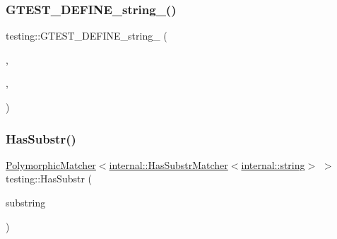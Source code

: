 \mbox{\label{namespacetesting_a145c2b7b4242b148b8d167f737b0d7c6}} 
\subsubsection{\texorpdfstring{G\+T\+E\+S\+T\+\_\+\+D\+E\+F\+I\+N\+E\+\_\+string\+\_\+()}{GTEST\_DEFINE\_string\_()}\hspace{0.1cm}{\footnotesize\ttfamily [5/5]}}
{\footnotesize\ttfamily testing\+::\+G\+T\+E\+S\+T\+\_\+\+D\+E\+F\+I\+N\+E\+\_\+string\+\_\+ (\begin{DoxyParamCaption}\item[{stream\+\_\+result\+\_\+to}]{,  }\item[{\hyperlink{namespacetesting_1_1internal_ac54dabc540bf79c2de91add679bfb93b}{internal\+::\+String\+From\+G\+Test\+Env}(\char`\"{}stream\+\_\+result\+\_\+to\char`\"{}, \char`\"{}\char`\"{})}]{,  }\item[{\char`\"{}This flag specifies the host name and the port number on which to stream \char`\"{} \char`\"{}test results. Example\+: \textbackslash{}alhost\+:555\textbackslash{}he flag is effective only on \char`\"{} \char`\"{}Linux.\char`\"{}}]{ }\end{DoxyParamCaption})}

\mbox{\label{namespacetesting_a7d27682e38d57eea81ba145a2772e1c7}} 
\subsubsection{\texorpdfstring{Has\+Substr()}{HasSubstr()}}
{\footnotesize\ttfamily \hyperlink{classtesting_1_1PolymorphicMatcher}{Polymorphic\+Matcher}$<$\hyperlink{classtesting_1_1internal_1_1HasSubstrMatcher}{internal\+::\+Has\+Substr\+Matcher}$<$\hyperlink{namespacetesting_1_1internal_a8e8ff5b11e64078831112677156cb111}{internal\+::string}$>$ $>$ testing\+::\+Has\+Substr (\begin{DoxyParamCaption}\item[{const \hyperlink{namespacetesting_1_1internal_a8e8ff5b11e64078831112677156cb111}{internal\+::string} \&}]{substring }\end{DoxyParamCaption})\hspace{0.3cm}{\ttfamily [inline]}}



